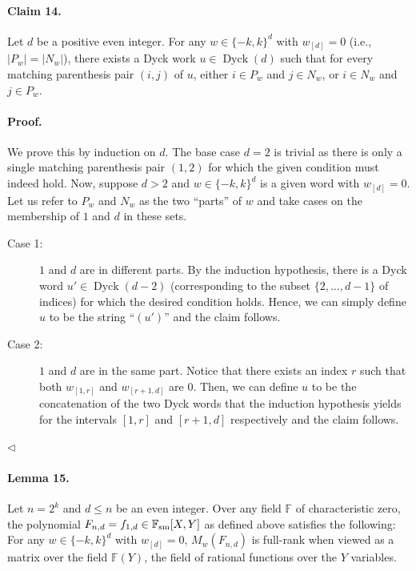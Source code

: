 \documentclass[10pt,a4paper]{article}
\begin{document}
\paragraph{Claim 14.} Let $d$ be a positive even integer. For any $w\in\{-k,k\}^d$ with $w_{[d]}=0$ (i.e., $|P_w|=|N_w|$), there exists a Dyck work $u\in\operatorname{Dyck}(d)$ such that for every matching parenthesis pair $(i,j)$ of $u$, either $i\in P_w$ and $j\in N_w$, or $i\in N_w$ and $j\in P_w$.
\paragraph{Proof.} We prove this by induction on $d$. The base case $d=2$ is trivial as there is only a single matching parenthesis pair $(1,2)$ for which the given condition must indeed hold. Now, suppose $d>2$ and $w\in\{-k,k\}^d$ is a given word with $w_{[d]}=0$. Let us refer to $P_w$ and $N_w$ as the two ``parts'' of $w$ and take cases on the membership of $1$ and $d$ in these sets.
\begin{description}
\item[Case 1:] $1$ and $d$ are in different parts. By the induction hypothesis, there is a Dyck word $u'\in\operatorname{Dyck}(d-2)$ (corresponding to the subset $\{2,\ldots,d-1\}$ of indices) for which the desired condition holds. Hence, we can simply define $u$ to be the string ``$(u')$'' and the claim follows.
\item[Case 2:] $1$ and $d$ are in the same part. Notice that there exists an index $r$ such that both $w_{[1,r]}$ and $w_{[r+1,d]}$ are $0$. Then, we can define $u$ to be the concatenation of the two Dyck words that the induction hypothesis yields for the intervals $[1,r]$ and $[r+1,d]$ respectively and the claim follows.
\end{description}\hfill$\triangleleft$
\paragraph{Lemma 15.} Let $n=2^k$ and $d\leq n$ be an even integer. Over any field $\mathbb F$ of characteristic zero, the polynomial $F_{n,d}=f_{1,d}\in\mathbb F_{\rm sm}[X,Y]$ as defined above satisfies the following: For any $w\in\{-k,k\}^d$ with $w_{[d]}=0$, $M_w(F_{n,d})$ is full-rank when viewed as a matrix over the field $\mathbb F(Y)$, the field of rational functions over the $Y$ variables.
\end{document}
